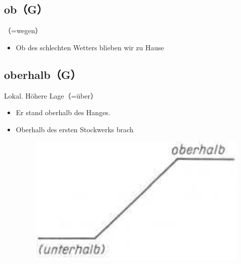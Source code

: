 \documentclass[UTF8]{report}
\begin{document}
\subsection{ob（G）}
（=wegen）
\begin{itemize}
    \item Ob des schlechten Wetters blieben wir zu Hause
\end{itemize}
\subsection{oberhalb（G）}
Lokal. Höhere Lage（=über）
\begin{itemize}
    \item Er stand oberhalb des Hanges.
    \item Oberhalb des ersten Stockwerks brach
    \begin{figure}[H]
        \centering
        \includegraphics[scale=0.3]{ober.png}
    \end{figure}
\end{itemize}
\end{document}

